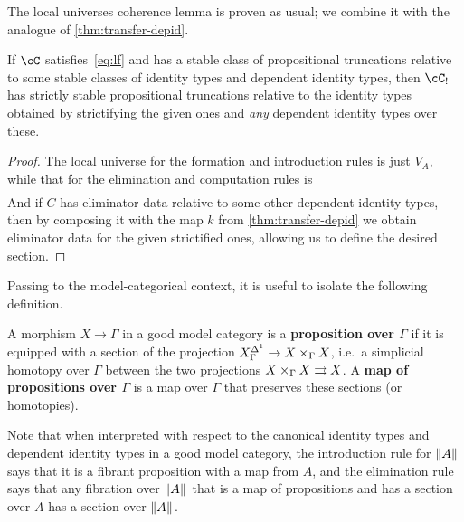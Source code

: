 \documentclass{amsart}
\let\C\cC
\def\tr{\mathsf{tr}}
\let\Id\fId
\begin{document}
The local universes coherence lemma is proven as usual; we combine it with the analogue of \cref{thm:transfer-depid}.

\begin{lem}
  If $\C$ satisfies~\eqref{eq:lf} and has a stable class of propositional truncations relative to some stable classes of identity types and dependent identity types, then $\C_!$ has strictly stable propositional truncations relative to the identity types obtained by strictifying the given ones and \emph{any} dependent identity types over these.
\end{lem}
\begin{proof}
  The local universe for the formation and introduction rules is just $V_A$, while that for the elimination and computation rules is
  \begin{align*}
    [& a:V_A,\\
    &c:\prod z:E_{\brck A}(a) . V_C \\
    &t:\prod x:E_{A}(a) . E_C(c(\tr(x))) \\
    &d:\prod x,y:E_{\brck A}(a), u:E_C(c(x)), v:E_C(c(y)) . E_{\Id^{\brck A}_C}(a,x,y,u,v) ]
  \end{align*}
  And if $C$ has eliminator data relative to some other dependent identity types, then by composing it with the map $k$ from \cref{thm:transfer-depid} we obtain eliminator data for the given strictified ones, allowing us to define the desired section.
\end{proof}

Passing to the model-categorical context, it is useful to isolate the following definition.

\begin{defn}\label{defn:prop}
  A morphism $X\to \Gamma$ in a good model category is a \textbf{proposition over $\Gamma$} if it is equipped with a section of the projection $X^{\Delta^1}_\Gamma \to X\times_\Gamma X$, i.e.\ a simplicial homotopy over $\Gamma$ between the two projections $X\times_\Gamma X \rightrightarrows X$.
  A \textbf{map of propositions over $\Gamma$} is a map over $\Gamma$ that preserves these sections (or homotopies).
\end{defn}

Note that when interpreted with respect to the canonical identity types and dependent identity types in a good model category, the introduction rule for $\mathopen{}\left\Vert A\right\Vert_{}\mathclose{}$ says that it is a fibrant proposition with a map from $A$, and the elimination rule says that any fibration over $\mathopen{}\left\Vert A\right\Vert_{}\mathclose{}$ that is a map of propositions and has a section over $A$ has a section over $\mathopen{}\left\Vert A\right\Vert_{}\mathclose{}$.
\end{document}

